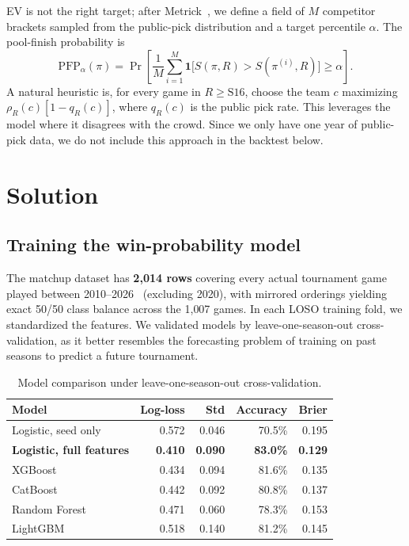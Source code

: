 \documentclass[12pt]{article}
\begin{document}
EV is not the right target; after Metrick~\cite{metrick}, we define a field of $M$ competitor brackets sampled from the public-pick distribution and a target percentile $\alpha$. The pool-finish probability is
\begin{equation}
\mathrm{PFP}_\alpha(\pi) = \Pr\!\left[\frac{1}{M}\sum_{i=1}^M \mathbf{1}\!\big[S(\pi, R) > S(\pi^{(i)}, R)\big] \ge \alpha\right].
\end{equation}
A natural heuristic is, for every game in $R \ge \mathrm{S16}$, choose the team $c$ maximizing $\rho_R(c)[1-q_R(c)]$, where $q_R(c)$ is the public pick rate. This leverages the model where it disagrees with the crowd. Since we only have one year of public-pick data, we do not include this approach in the backtest below.

\section{Solution}

\subsection{Training the win-probability model}

The matchup dataset has \textbf{2{,}014 rows} covering every actual tournament game played between 2010--2026~\cite{sportsref} (excluding 2020), with mirrored orderings yielding exact 50/50 class balance across the 1{,}007 games. In each LOSO training fold, we standardized the features. We validated models by leave-one-season-out cross-validation, as it better resembles the forecasting problem of training on past seasons to predict a future tournament.

\begin{table}[H]
\centering
\begin{tabular}{lrrrr}
\toprule
Model & Log-loss & Std & Accuracy & Brier \\
\midrule
Logistic, seed only & 0.572 & 0.046 & 70.5\% & 0.195 \\
\textbf{Logistic, full features} & \textbf{0.410} & \textbf{0.090} & \textbf{83.0\%} & \textbf{0.129} \\
XGBoost~\cite{xgboost} & 0.434 & 0.094 & 81.6\% & 0.135 \\
CatBoost~\cite{catboost} & 0.442 & 0.092 & 80.8\% & 0.137 \\
Random Forest~\cite{sklearn} & 0.471 & 0.060 & 78.3\% & 0.153 \\
LightGBM~\cite{lightgbm} & 0.518 & 0.140 & 81.2\% & 0.145 \\
\bottomrule
\end{tabular}
\caption{Model comparison under leave-one-season-out cross-validation.}
\end{table}
\end{document}
